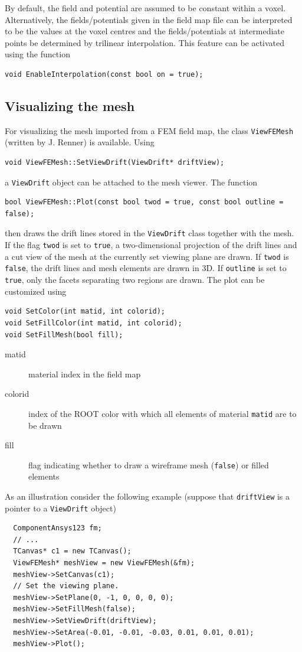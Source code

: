 By default, the field and potential are assumed to be constant within 
a voxel. Alternatively, the fields/potentials given in the field map file
can be interpreted to be the values at the voxel centres and the 
fields/potentials at intermediate points be determined by trilinear interpolation.
This feature can be activated using the function
\begin{lstlisting}
void EnableInterpolation(const bool on = true);
\end{lstlisting} 
 
\subsection{Visualizing the mesh}

For visualizing the mesh imported from a FEM field map, the class 
\texttt{ViewFEMesh} (written by J. Renner) is available. 
Using 
\begin{lstlisting}
void ViewFEMesh::SetViewDrift(ViewDrift* driftView);
\end{lstlisting}
a \texttt{ViewDrift} object can be attached to the mesh viewer. 
The function
\begin{lstlisting}
bool ViewFEMesh::Plot(const bool twod = true, const bool outline = false);
\end{lstlisting}
then draws the drift lines stored in the \texttt{ViewDrift} class together with the mesh.
If the flag \texttt{twod} is set to \texttt{true}, 
a two-dimensional projection of the drift lines and a cut view of the mesh at the currently set viewing plane are drawn. 
If \texttt{twod} is \texttt{false}, the drift lines and mesh elements are drawn in 3D. If \texttt{outline} is set to \texttt{true}, only the 
facets separating two regions are drawn. 
The plot can be customized using 
\begin{lstlisting}
void SetColor(int matid, int colorid);
void SetFillColor(int matid, int colorid);
void SetFillMesh(bool fill);
\end{lstlisting}
\begin{description}
  \item[matid] material index in the field map
  \item[colorid] index of the ROOT color with which all elements of material 
                 \texttt{matid} are to be drawn 
  \item[fill] flag indicating whether to draw a wireframe mesh (\texttt{false}) 
              or filled elements
\end{description}
As an illustration consider the following example 
(suppose that \texttt{driftView} is a pointer to a \texttt{ViewDrift} object) 
\begin{lstlisting}
  ComponentAnsys123 fm;
  // ...
  TCanvas* c1 = new TCanvas();
  ViewFEMesh* meshView = new ViewFEMesh(&fm);
  meshView->SetCanvas(c1);
  // Set the viewing plane.
  meshView->SetPlane(0, -1, 0, 0, 0, 0);
  meshView->SetFillMesh(false);
  meshView->SetViewDrift(driftView);
  meshView->SetArea(-0.01, -0.01, -0.03, 0.01, 0.01, 0.01);
  meshView->Plot();
\end{lstlisting}

